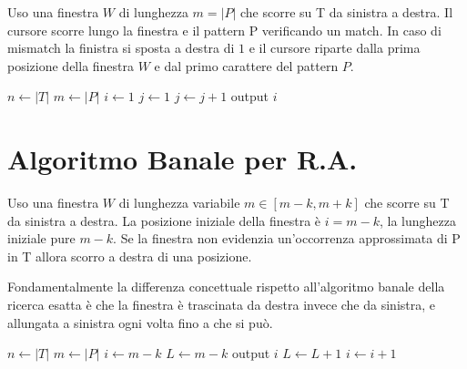 Uso una finestra $W$ di lunghezza $m = |P|$ che scorre su T da sinistra a destra. Il cursore scorre lungo la finestra e il pattern P verificando un match. In caso di mismatch la finistra si sposta a destra di $1$ e il cursore riparte dalla prima posizione della finestra $W$ e dal primo carattere del pattern $P$.

\begin{algorithm}
    \begin{algorithmic}
            \State $n \gets |T|$
            \State $m \gets |P|$
            \State $i \gets 1$
              \State $j \gets 1$
                \State $j \gets j+1$
              \EndWhile
                \State output $i$
              \EndIf
            \EndWhile
        \EndProcedure
    \end{algorithmic}
\end{algorithm}

\section{Algoritmo Banale per R.A.}

Uso una finestra $W$ di lunghezza variabile $m \in [m-k, m+k]$ che scorre su T da sinistra a destra. La posizione iniziale della finestra \`e $i = m-k$, la lunghezza iniziale pure $m - k$. Se la finestra non evidenzia un'occorrenza approssimata di P in T allora scorro a destra di una posizione.

Fondamentalmente la differenza concettuale rispetto all'algoritmo banale della ricerca esatta \`e che la finestra \`e trascinata da destra invece che da sinistra, e allungata a sinistra ogni volta fino a che si pu\`o.

\begin{algorithm}
    \begin{algorithmic}
            \State $n \gets |T|$
            \State $m \gets |P|$
            \State $i \gets m-k$
              \State $L \gets m-k$
                  \State output $i$
                \EndIf
                \State $L \gets L+1$
              \EndWhile
              \State $i \gets i+1$
            \EndWhile
        \EndProcedure
    \end{algorithmic}
\end{algorithm}
